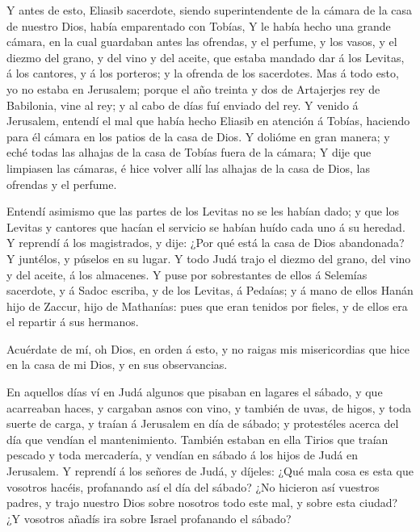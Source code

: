  Y antes de esto, Eliasib sacerdote, siendo superintendente
de la cámara de la casa de nuestro Dios, había emparentado con Tobías,
 Y le había hecho una grande cámara, en la cual guardaban
antes las ofrendas, y el perfume, y los vasos, y el diezmo del grano, y
del vino y del aceite, que estaba mandado dar á los Levitas, á los
cantores, y á los porteros; y la ofrenda de los sacerdotes. 
Mas á todo esto, yo no estaba en Jerusalem; porque el año treinta y dos
de Artajerjes rey de Babilonia, vine al rey; y al cabo de días fuí
enviado del rey.  Y venido á Jerusalem, entendí el mal que
había hecho Eliasib en atención á Tobías, haciendo para él cámara en los
patios de la casa de Dios.  Y dolióme en gran manera; y eché
todas las alhajas de la casa de Tobías fuera de la cámara; 
Y dije que limpiasen las cámaras, é hice volver allí las alhajas de la
casa de Dios, las ofrendas y el perfume.

 Entendí asimismo que las partes de los Levitas no se les
habían dado; y que los Levitas y cantores que hacían el servicio se
habían huído cada uno á su heredad.  Y reprendí á los
magistrados, y dije: ¿Por qué está la casa de Dios abandonada? Y
juntélos, y púselos en su lugar.  Y todo Judá trajo el
diezmo del grano, del vino y del aceite, á los almacenes. 
Y puse por sobrestantes de ellos á Selemías sacerdote, y á Sadoc
escriba, y de los Levitas, á Pedaías; y á mano de ellos Hanán hijo de
Zaccur, hijo de Mathanías: pues que eran tenidos por fieles, y de ellos
era el repartir á sus hermanos.

 Acuérdate de mí, oh Dios, en orden á esto, y no raigas mis
misericordias que hice en la casa de mi Dios, y en sus observancias.

 En aquellos días ví en Judá algunos que pisaban en lagares
el sábado, y que acarreaban haces, y cargaban asnos con vino, y también
de uvas, de higos, y toda suerte de carga, y traían á Jerusalem en día
de sábado; y protestéles acerca del día que vendían el mantenimiento.
 También estaban en ella Tirios que traían pescado y toda
mercadería, y vendían en sábado á los hijos de Judá en Jerusalem.
 Y reprendí á los señores de Judá, y díjeles: ¿Qué mala
cosa es esta que vosotros hacéis, profanando así el día del sábado?
 ¿No hicieron así vuestros padres, y trajo nuestro Dios
sobre nosotros todo este mal, y sobre esta ciudad? ¿Y vosotros añadís
ira sobre Israel profanando el sábado?

